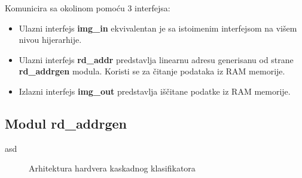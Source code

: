 Komunicira sa okolinom pomoću 3 interfejsa:
\begin{itemize}
  \item Ulazni interfejs \textbf{img\_in} ekvivalentan je sa istoimenim
    interfejsom na višem nivou hijerarhije.
  \item Ulazni interfejs \textbf{rd\_addr} predstavlja linearnu adresu
    generisanu od strane \textbf{rd\_addrgen} modula. Koristi se za čitanje
    podataka iz RAM memorije.
  \item Izlazni interfejs \textbf{img\_out} predstavlja iščitane podatke iz RAM memorije.
\end{itemize}

\subsection{Modul rd\_addrgen}

asd

\begin{figure}[h]
    
\caption{Arhitektura hardvera kaskadnog klasifikatora}
\label{hw_arch_top}
\end{figure}